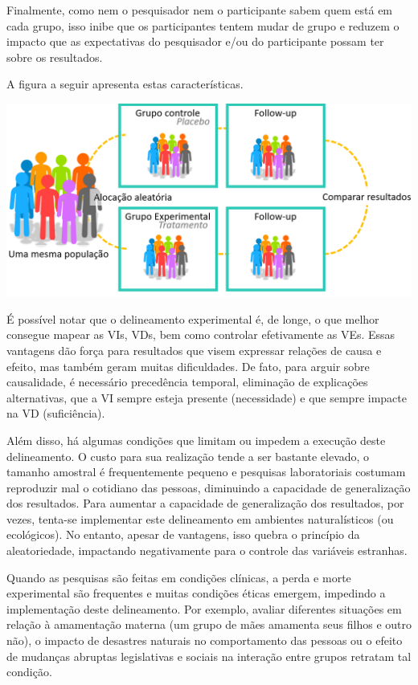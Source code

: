 \documentclass[
]{book}
\begin{document}
Finalmente, como nem o pesquisador nem o participante sabem quem está em cada grupo, isso inibe que os participantes tentem mudar de grupo e reduzem o impacto que as expectativas do pesquisador e/ou do participante possam ter sobre os resultados.

A figura a seguir apresenta estas características.

\includegraphics{./img/cap_experimento.png}

É possível notar que o delineamento experimental é, de longe, o que melhor consegue mapear as VIs, VDs, bem como controlar efetivamente as VEs. Essas vantagens dão força para resultados que visem expressar relações de causa e efeito, mas também geram muitas dificuldades. De fato, para arguir sobre causalidade, é necessário precedência temporal, eliminação de explicações alternativas, que a VI sempre esteja presente (necessidade) e que sempre impacte na VD (suficiência).

Além disso, há algumas condições que limitam ou impedem a execução deste delineamento. O custo para sua realização tende a ser bastante elevado, o tamanho amostral é frequentemente pequeno e pesquisas laboratoriais costumam reproduzir mal o cotidiano das pessoas, diminuindo a capacidade de generalização dos resultados. Para aumentar a capacidade de generalização dos resultados, por vezes, tenta-se implementar este delineamento em ambientes naturalísticos (ou ecológicos). No entanto, apesar de vantagens, isso quebra o princípio da aleatoriedade, impactando negativamente para o controle das variáveis estranhas.

Quando as pesquisas são feitas em condições clínicas, a perda e morte experimental são frequentes e muitas condições éticas emergem, impedindo a implementação deste delineamento. Por exemplo, avaliar diferentes situações em relação à amamentação materna (um grupo de mães amamenta seus filhos e outro não), o impacto de desastres naturais no comportamento das pessoas ou o efeito de mudanças abruptas legislativas e sociais na interação entre grupos retratam tal condição.
\end{document}
